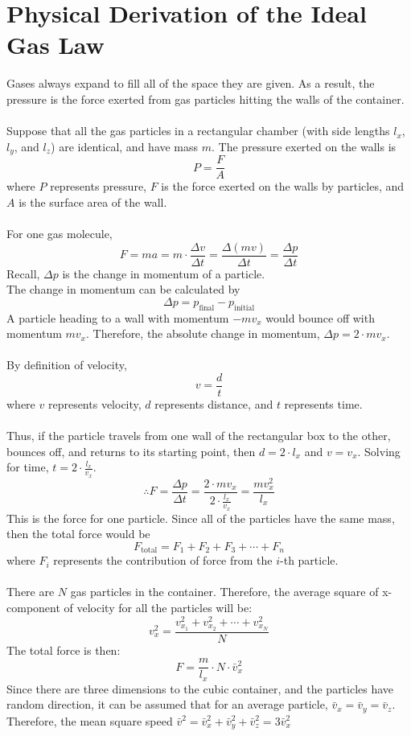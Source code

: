 \documentclass[10pt]{article}
\begin{document}
\section*{Physical Derivation of the Ideal Gas Law}
Gases always expand to fill all of the space they are given.  As a result, the pressure is the force exerted from gas particles hitting the walls of the container.\\\\
Suppose that all the gas particles in a rectangular chamber (with side lengths $l_x$, $l_y$, and $l_z$) are identical, and have mass $m$.  The pressure exerted on the walls is 
\[P = \frac{F}{A}\]
where $P$ represents pressure, $F$ is the force exerted on the walls by particles, and $A$ is the surface area of the wall.\\\\
For one gas molecule,
\[F = ma = m \cdot \frac{\Delta v}{\Delta t} = \frac{\Delta(mv)}{\Delta t} = \frac{\Delta p}{\Delta t}\]
Recall, $\Delta p$ is the change in momentum of a particle.\\
The change in momentum can be calculated by 
\[\Delta p = p_{\text{final}} - p_{\text{initial}}\]
A particle heading to a wall with momentum $-mv_x$ would bounce off with momentum $mv_x$.  Therefore, the absolute change in momentum, $\Delta p = 2 \cdot mv_x$.\\\\
By definition of velocity,
\[v = \frac{d}{t}\]
where $v$ represents velocity, $d$ represents distance, and $t$ represents time.\\\\
Thus, if the particle travels from one wall of the rectangular box to the other, bounces off, and returns to its starting point, then $d = 2 \cdot l_x$ and $v = v_x$.  Solving for time, $t = 2 \cdot \frac{l_x}{v_x}$.
\[\therefore F = \frac{\Delta p}{\Delta t} = \frac{2 \cdot mv_x}{2 \cdot \frac{l_x}{v_x}} = \frac{mv_x^2}{l_x}\]
This is the force for one particle.  Since all of the particles have the same mass, then the total force would be 
\[F_{\text{total}} = F_1 + F_2 + F_3 + \cdots + F_n\]
where $F_i$ represents the contribution of force from the $i$-th particle.\\\\
There are $N$ gas particles in the container.  Therefore, the average square of x-component of velocity for all the particles will be:
\[v_x^2 = \frac{v_{x_1}^2 + v_{x_2}^2 + \cdots + v_{x_N}^2}{N}\]
The total force is then:
\[F = \frac{m}{l_x} \cdot N \cdot \bar v_x^2\]
Since there are three dimensions to the cubic container, and the particles have random direction, it can be assumed that for an average particle, $\bar v_x = \bar v_y = \bar v_z$.  Therefore, the mean square speed $\bar v^2 = \bar v_x^2 + \bar v_y^2 + \bar v_z^2 = 3\bar v_x^2$
\end{document}

